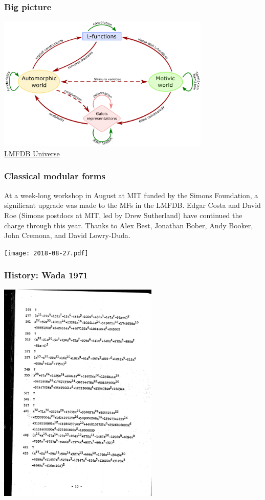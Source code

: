 \documentclass[xcolor=dvipsnames]{beamer}
\theoremstyle{plain}
\begin{document}
\begin{frame}[plain]
\frametitle{Big picture} \pause

\begin{center}
\includegraphics[width=4in]{lmfdbmap.pdf} \\
\href{http://www.lmfdb.org/universe}{LMFDB Universe}
\end{center}

\end{frame}

\begin{frame}[plain]
\frametitle{Classical modular forms} \pause

At a week-long workshop in August at MIT funded by the Simons Foundation, a significant upgrade was made to the MFs in the LMFDB.  \pause  Edgar Costa and David Roe (Simons postdocs at MIT, led by Drew Sutherland) have continued the charge through this year.  \pause  Thanks to Alex Best, Jonathan Bober, Andy Booker, John Cremona, and David Lowry-Duda.  \pause

\begin{center}
\texttt{[image: 2018-08-27.pdf]}
\end{center}

\end{frame}

\begin{frame}[plain]
\frametitle{History: Wada 1971} \pause

\begin{center}
\includegraphics[width=3in]{Wada.pdf}
\end{center}

\end{frame}
\end{document}
